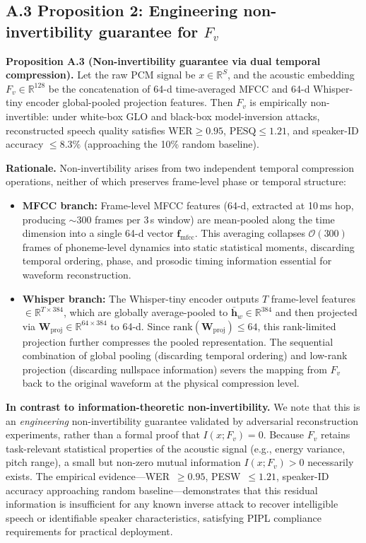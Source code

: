 \documentclass[11pt, a4paper]{article}
\begin{document}
\subsection*{A.3 Proposition 2: Engineering non-invertibility guarantee for $F_v$}

\noindent\textbf{Proposition A.3 (Non-invertibility guarantee via dual temporal compression).} Let the raw PCM signal be $x\in\mathbb{R}^{S}$, and the acoustic embedding $F_v\in\mathbb{R}^{128}$ be the concatenation of 64-d time-averaged MFCC and 64-d Whisper-tiny encoder global-pooled projection features. Then $F_v$ is empirically non-invertible: under white-box GLO and black-box model-inversion attacks, reconstructed speech quality satisfies $\text{WER}\ge 0.95$, $\text{PESQ}\le 1.21$, and speaker-ID accuracy $\le 8.3\%$ (approaching the 10\% random baseline).

\noindent\textbf{Rationale.} Non-invertibility arises from two independent temporal compression operations, neither of which preserves frame-level phase or temporal structure:

\begin{itemize}
\item \textbf{MFCC branch:} Frame-level MFCC features (64-d, extracted at 10\,ms hop, producing $\sim$300 frames per 3\,s window) are mean-pooled along the time dimension into a single 64-d vector $\bm{f}_{\mathrm{mfcc}}$. This averaging collapses $\mathcal{O}(300)$ frames of phoneme-level dynamics into static statistical moments, discarding temporal ordering, phase, and prosodic timing information essential for waveform reconstruction.

\item \textbf{Whisper branch:} The Whisper-tiny encoder outputs $T$ frame-level features $\in\mathbb{R}^{T\times 384}$, which are globally average-pooled to $\bar{\bm{h}}_w\in\mathbb{R}^{384}$ and then projected via $\bm{W}_{\mathrm{proj}}\in\mathbb{R}^{64\times 384}$ to 64-d. Since $\mathrm{rank}(\bm{W}_{\mathrm{proj}})\le 64$, this rank-limited projection further compresses the pooled representation. The sequential combination of global pooling (discarding temporal ordering) and low-rank projection (discarding nullspace information) severs the mapping from $F_v$ back to the original waveform at the physical compression level.
\end{itemize}

\noindent\textbf{In contrast to information-theoretic non-invertibility.} We note that this is an \emph{engineering} non-invertibility guarantee validated by adversarial reconstruction experiments, rather than a formal proof that $I(x;F_v)=0$. Because $F_v$ retains task-relevant statistical properties of the acoustic signal (e.g., energy variance, pitch range), a small but non-zero mutual information $I(x;F_v)>0$ necessarily exists. The empirical evidence---WER~$\ge 0.95$, PESW~$\le 1.21$, speaker-ID accuracy approaching random baseline---demonstrates that this residual information is insufficient for any known inverse attack to recover intelligible speech or identifiable speaker characteristics, satisfying PIPL compliance requirements for practical deployment.
\end{document}
